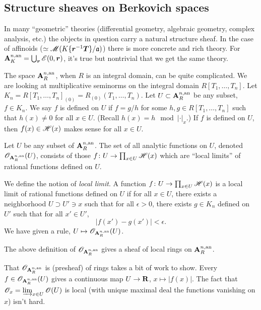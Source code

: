 \subsection{Structure sheaves on Berkovich spaces}

In many ``geometric'' theories (differential geometry, algebraic geometry, 
complex analysis, etc.) the objects in question carry a natural structure 
sheaf. In the case of affinoids 
($\simeq \operatorname{\mathscr{M}}(K\{ \bm r^{-1} \bm T \}/\mathfrak{a})$) there is more concrete and 
rich theory. For $\mathbf{A}_K^{n,\mathrm{an}}=\bigcup_{\bm r} \mathscr{E}(0,\bm r)$, it's true but 
nontrivial that we get the same theory. 

The space $\mathbf{A}_R^{n,\mathrm{an}}$, when $R$ is an integral domain, can be quite 
complicated. We are looking at multiplicative seminorms on the integral domain 
$R[T_1,\dots,T_n]$. Let $K_n=R[T_1,\dots,T_n]_{(0)} = R_{(0)}(T_1,\dots,T_n)$. 
Let $U\subset \mathbf{A}_R^{n,\mathrm{an}}$ be any subset, $f\in K_n$. We say $f$ is defined 
on $U$ if $f=g/h$ for some $h,g\in R[T_1,\dots,T_n]$ such that $h(x)\ne 0$ for 
all $x\in U$. (Recall $h(x)=h\mod |\cdot|_x$.) If $f$ is defined on $U$, then 
$f(x)\in \mathscr{H}(x)$ makes sense for all $x\in U$. 

\begin{definition}
Let $U$ be any subset of $\mathbf{A}_R^{n,\mathrm{an}}$. The set of all analytic functions on 
$U$, denoted $\mathscr{O}_{\mathbf{A}_R^{n,\mathrm{an}}}(U)$, consists of those 
$f\colon U\to \prod_{x\in U} \mathscr{H}(x)$ which are ``local limits'' of rational 
functions defined on $U$. 
\end{definition}

We define the notion of \emph{local limit}. A function 
$f\colon U\to \prod_{x\in U} \mathscr{H}(x)$ is a local limit of rational functions 
defined on $U$ if for all $x\in U$, there exists a neighborhood 
$U\supset U'\ni x$ such that for all $\epsilon>0$, there exists $g\in K_n$ 
defined on $U'$ such that for all $x'\in U'$, 
\[
	|f(x')-g(x')|<\epsilon .
\]
We have given a rule, $U\mapsto \mathscr{O}_{\mathbf{A}_R^{n,\mathrm{an}}}(U)$. 

\begin{theorem}
The above definition of $\mathscr{O}_{\mathbf{A}_R^{n,\mathrm{an}}}$ gives a sheaf of local rings on 
$\mathbf{A}_R^{n,\mathrm{an}}$. 
\end{theorem}
That $\mathscr{O}_{\mathbf{A}_R^{n,\mathrm{an}}}$ is (presheaf) of rings takes a bit of work to show. 
Every $f\in \mathscr{O}_{\mathbf{A}_R^{n,\mathrm{an}}}(U)$ gives a continuous map $U\to \mathbf{R}$, 
$x\mapsto |f(x)|$. The fact that $\mathscr{O}_x=\varinjlim_{x\in U} \mathscr{O}(U)$ is local 
(with unique maximal deal the functions vanishing on $x$) isn't hard. 

